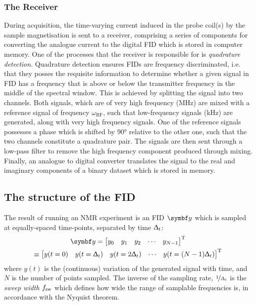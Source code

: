 \subsubsection{The Receiver}
During acquisition, the time-varying current induced in the probe coil(s) by
the sample magnetisation is
sent to a receiver, comprising a series of components for converting the
analogue current to the digital \ac{FID} which is stored in computer memory.
One of the processes that the receiver is responsible for is \emph{quadrature
detection}\cite[\S 13.6]{Keeler2010}. Quadrature detection ensures
\acp{FID} are frequency discriminated, i.e. that they posses the requisite
information to determine whether a given signal in \ac{FID} has a frequency
that is above or below the transmitter frequency in the middle of the spectral
window.
This is achieved by splitting the signal into two channels. Both
signals, which are of very high frequency (\unit{\mega\hertz}) are mixed with
a reference signal of frequency $\omega_{\text{RF}}$, such that low-frequency
signals (\unit{\kilo\hertz}) are generated, along with very high frequency
signals. One of the reference signals possesses a phase which is shifted by
\ang{90} relative to the other one, such that the two channels constitute a
quadrature pair. The signals are then sent through a low-pass filter to remove
the high frequency component produced through mixing. Finally, an analogue to
digital converter translates the signal to the real and imaginary components of
a binary dataset which is stored in memory.

\subsection{The structure of the \acs{FID}}
The result of running an \ac{NMR} experiment is an \ac{FID} $\by$ which is sampled at
equally-spaced time-points, separated by time $\Updelta_t$:
\begin{equation}
    \begin{gathered}
        \by = \begin{bmatrix}
            y_0 & y_1 & y_2 & \cdots & y_{N-1}
      \end{bmatrix}\T\\
      \equiv
      \begin{bmatrix}
          y(t=0) & y(t=\Dt) & y(t=2\Dt) & \cdots & y(t=(N-1)\Dt)
      \end{bmatrix}\T
    \end{gathered}
\end{equation}
where $y(t)$ is the (continuous) variation of the generated signal with time,
and $N$ is the number of points sampled. The inverse of the sampling rate,
$\nicefrac{1}{\Updelta_t}$ is the \emph{sweep width} $f_{\mathrm{sw}}$ which
defines how wide the range of samplable frequencies is, in accordance with the
Nyquist theorem\cite{Shannon1949}.

